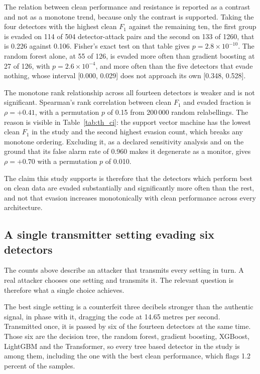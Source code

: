 The relation between clean performance and resistance is reported as a contrast and not
as a monotone trend, because only the contrast is supported. Taking the four detectors with
the highest clean $F_1$ against the remaining ten, the first group is evaded on 114 of 504
detector-attack pairs and the second on 133 of 1260, that is 0.226 against 0.106. Fisher's
exact test on that table gives $p = 2.8 \times 10^{-10}$. The random forest alone, at 55 of
126, is evaded more often than gradient boosting at 27 of 126, with $p = 2.6 \times
10^{-4}$, and more often than the five detectors that evade nothing, whose interval
[0.000, 0.029] does not approach its own [0.348, 0.528].

The monotone rank relationship across all fourteen detectors is weaker and is not
significant. Spearman's rank correlation between clean $F_1$ and evaded fraction is
$\rho = +0.41$, with a permutation $p$ of 0.15 from 200\,000 random relabellings. The
reason is visible in Table~\ref{tab:th_ci}: the support vector machine has the lowest clean
$F_1$ in the study and the second highest evasion count, which breaks any monotone
ordering. Excluding it, as a declared sensitivity analysis and on the ground that its false
alarm rate of 0.960 makes it degenerate as a monitor, gives $\rho = +0.70$ with a
permutation $p$ of 0.010.

The claim this study supports is therefore that the detectors which perform best on clean
data are evaded substantially and significantly more often than the rest, and not that
evasion increases monotonically with clean performance across every architecture.

\subsection{A single transmitter setting evading six detectors}
\label{sec:res_single}

The counts above describe an attacker that transmits every setting in turn. A real
attacker chooses one setting and transmits it. The relevant question is therefore what a
single choice achieves.

The best single setting is a counterfeit three decibels stronger than the authentic
signal, in phase with it, dragging the code at 14.65 metres per second. Transmitted once,
it is passed by six of the fourteen detectors at the same time. Those six are the
decision tree, the random forest, gradient boosting, XGBoost, LightGBM and the
Transformer, so every tree based detector in the study is among them, including the one
with the best clean performance, which flags 1.2 percent of the samples.

